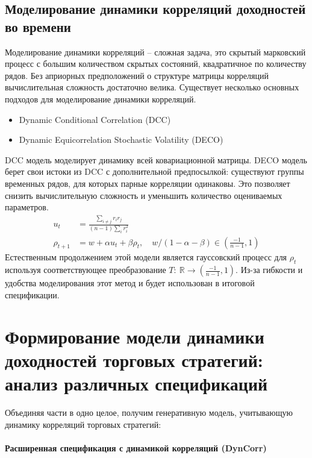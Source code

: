 \subsection{Моделирование динамики корреляций доходностей во времени}
Моделирование динамики корреляций -- сложная задача, это скрытый марковский процесс с большим количеством скрытых состояний, квадратичное по количеству рядов. Без априорных предположений о структуре матрицы корреляций вычислительная сложность достаточно велика. Существует несколько основных подходов для моделирование динамики корреляций.
\begin{itemize}
	\item Dynamic Conditional Correlation (DCC) \citep{engle2000}
	\item Dynamic Equicorrelation Stochastic Volatility (DECO) \citep{kurose2016}
\end{itemize}
DCC модель моделирует динамику всей ковариационной матрицы. DECO модель берет свои истоки из DCC с дополнительной предпосылкой: существуют группы временных рядов, для которых парные корреляции одинаковы. Это позволяет снизить вычислительную сложность и уменьшить количество оцениваемых параметров.
\begin{align}
u_t &= \frac{\sum_{i\neq j} r_i r_j}{(n-1) \sum_{i} r_i^2}\\
\rho_{t+1} &= w + \alpha u_t + \beta \rho_t, \quad w/(1-\alpha-\beta) \in \left(\tfrac{-1}{n-1}, 1\right)
\end{align}
Естественным продолжением этой модели является гауссовский процесс для $\rho_t$ используя соответствующее преобразование $T:\: \mathbb{R} \to \left(\tfrac{-1}{n-1}, 1\right)$. Из-за гибкости и удобства моделирования этот метод и будет использован в итоговой спецификации.

\section{Формирование модели динамики доходностей торговых стратегий: анализ различных спецификаций}
Объединяя части в одно целое, получим генеративную модель, учитывающую динамику корреляций торговых стратегий:
\paragraph{Расширенная спецификация с динамикой корреляций (DynCorr)}



